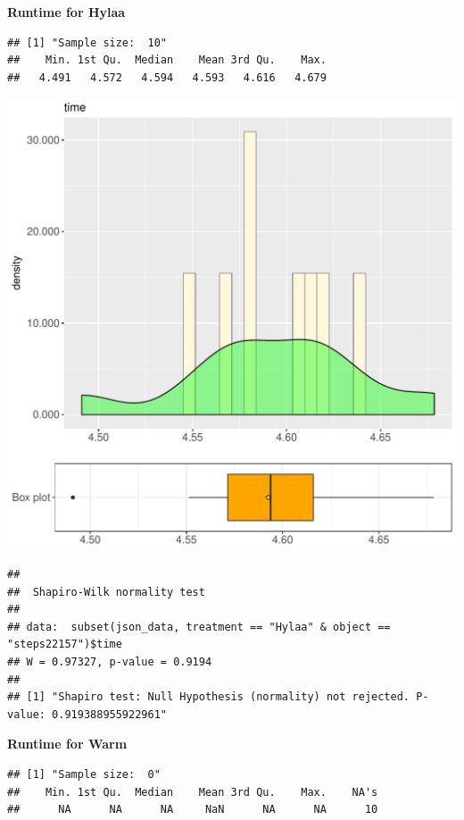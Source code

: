 \documentclass{article}\usepackage[]{graphicx}\usepackage[]{color}
\makeatletter
\def\maxwidth{ %
  \ifdim\Gin@nat@width>\linewidth
    \linewidth
  \else
    \Gin@nat@width
  \fi
}
\newenvironment{kframe}{%
 \def\at@end@of@kframe{}%
 \ifinner\ifhmode%
  \def\at@end@of@kframe{\end{minipage}}%
  \begin{minipage}{\columnwidth}%
 \fi\fi%
 \def\FrameCommand##1{\hskip\@totalleftmargin \hskip-\fboxsep
 \colorbox{shadecolor}{##1}\hskip-\fboxsep
     \hskip-\linewidth \hskip-\@totalleftmargin \hskip\columnwidth}%
 \MakeFramed {\advance\hsize-\width
   \@totalleftmargin\z@ \linewidth\hsize
   \@setminipage}}%
 {\par\unskip\endMakeFramed%
 \at@end@of@kframe}
\newenvironment{knitrout}{}{} %
\makeatother
\begin{document}
 \textbf{Runtime for Hylaa}
\begin{knitrout}
\color{fgcolor}\begin{kframe}
\begin{verbatim}
## [1] "Sample size:  10"
##    Min. 1st Qu.  Median    Mean 3rd Qu.    Max. 
##   4.491   4.572   4.594   4.593   4.616   4.679
\end{verbatim}
\end{kframe}
\includegraphics[width=\maxwidth]{figure/RH1_Hylaa_steps22157-1} 
\begin{kframe}\begin{verbatim}
## 
## 	Shapiro-Wilk normality test
## 
## data:  subset(json_data, treatment == "Hylaa" & object == "steps22157")$time
## W = 0.97327, p-value = 0.9194
## 
## [1] "Shapiro test: Null Hypothesis (normality) not rejected. P-value: 0.919388955922961"
\end{verbatim}
\end{kframe}
\end{knitrout}
 \textbf{Runtime for Warm}
\begin{knitrout}
\color{fgcolor}\begin{kframe}
\begin{verbatim}
## [1] "Sample size:  0"
##    Min. 1st Qu.  Median    Mean 3rd Qu.    Max.    NA's 
##      NA      NA      NA     NaN      NA      NA      10
\end{verbatim}
\end{kframe}
\end{knitrout}
  
\end{document}
